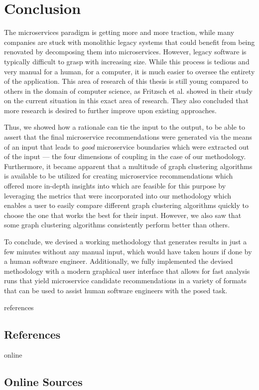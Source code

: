 \documentclass[12pt,a4paper]{report}
\begin{document}
\chapter{Conclusion} \label{chap:conclusion}

The microservices paradigm is getting more and more traction, while many
companies are stuck with monolithic legacy systems that could benefit from
being renovated by decomposing them into microservices. However, legacy
software is typically difficult to grasp with increasing size. While this
process is tedious and very manual for a human, for a computer, it is much
easier to oversee the entirety of the application. This area of research of
this thesis is still young compared to others in the domain of computer
science, as Fritzsch et al. showed in their study on the current situation in
this exact area of research. They also concluded that more research is desired
to further improve upon existing approaches.

Thus, we showed how a rationale can tie the input to the output, to be able to
assert that the final microservice recommendations were generated via the means
of an input that leads to \textit{good} microservice boundaries which were
extracted out of the input --- the four dimensions of coupling in the case of
our methodology. Furthermore, it became apparent that a multitude of graph
clustering algorithms is available to be utilized for creating microservice
recommendations which offered more in-depth insights into which are feasible
for this purpose by leveraging the metrics that were incorporated into our
methodology which enables a user to easily compare different graph clustering
algorithms quickly to choose the one that works the best for their input.
However, we also saw that some graph clustering algorithms consistently perform
better than others.

To conclude, we devised a working methodology that generates results in just a
few minutes without any manual input, which would have taken hours if done by a
human software engineer. Additionally, we fully implemented the devised
methodology with a modern graphical user interface that allows for fast
analysis runs that yield microservice candidate recommendations in a variety of
formats that can be used to assist human software engineers with the posed task.




\newpage
{}
\listoffigures
\newpage
{}
\listoftables
\newpage
{}

\begin{btSect}{references}
\section*{\huge{References}}
\btPrintCited
\end{btSect}
\begin{btSect}{online}
\section*{\huge{Online Sources}}
\btPrintCited
\end{btSect}
\end{document}
